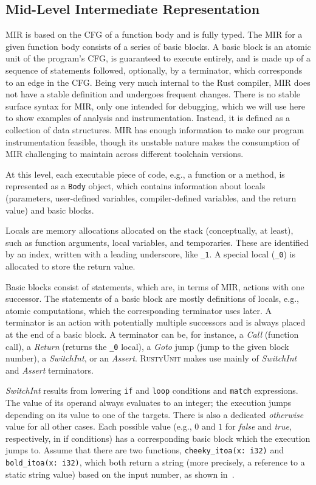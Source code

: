 \documentclass[paper=a4,%
  twoside,%
  BCOR4mm,%
  abstract=true,%
  toc=bibliography,%
  chapterprefix=true,%
  toc=bibliographynumbered,%
  open=right,%
  english,%
  pagesize=pdftex]{scrreprt}
\newcommand{\tech}{\textsc{RustyUnit}\xspace}
\newcommand{\mir}{\ac{MIR}\xspace}
\newcommand{\cfg}{\ac{CFG}\xspace}
\begin{document}
\subsection{Mid-Level Intermediate Representation}
\mir is based on the \cfg of a function body and is fully typed. The \mir for a given function body consists of a series of basic blocks. A basic block is an atomic unit of the program's \cfg, is guaranteed to execute entirely, and is made up of a sequence of statements followed, optionally, by a terminator, which corresponds to an edge in the \cfg. Being very much internal to the Rust compiler, \mir does not have a stable definition and undergoes frequent changes. There is no stable surface syntax for \mir, only one intended for debugging, which we will use here to show examples of analysis and instrumentation. Instead, it is defined as a collection of data structures. \mir has enough information to make our program instrumentation feasible, though its unstable nature makes the consumption of \mir challenging to maintain across different toolchain versions.

At this level, each executable piece of code, e.g., a function or a method, is represented as a \texttt{Body} object, which contains information about locals (parameters, user-defined variables, compiler-defined variables, and the return value) and basic blocks.

Locals are memory allocations allocated on the stack (conceptually, at least), such as function arguments, local variables, and temporaries. These are identified by an index, written with a leading underscore, like \texttt{\string_1}. A special local (\texttt{\string_0}) is allocated to store the return value. 

Basic blocks consist of statements, which are, in terms of \mir, actions with one successor. The statements of a basic block are mostly definitions of locals, e.g., atomic computations, which the corresponding terminator uses later. A terminator is an action with potentially multiple successors and is always placed at the end of a basic block. A terminator can be, for instance, a \emph{Call} (function call), a \emph{Return} (returns the \texttt{\string_0} local), a \emph{Goto} jump (jump to the given block number), a \emph{SwitchInt}, or an \emph{Assert}. \tech makes use mainly of \emph{SwitchInt} and \emph{Assert} terminators. 

\emph{SwitchInt} results from lowering \texttt{if} and \texttt{loop} conditions and \texttt{match} expressions. The value of its operand always evaluates to an integer; the execution jumps depending on its value to one of the targets. There is also a dedicated \emph{otherwise} value for all other cases. Each possible value (e.g., $0$ and $1$ for \emph{false} and \emph{true}, respectively, in if conditions) has a corresponding basic block which the execution jumps to. Assume that there are two functions, \texttt{cheeky\string_itoa(x: i32)} and \texttt{bold\string_itoa(x: i32)}, which both return a string (more precisely, a reference to a static string value) based on the input number, as shown in~.
\end{document}
